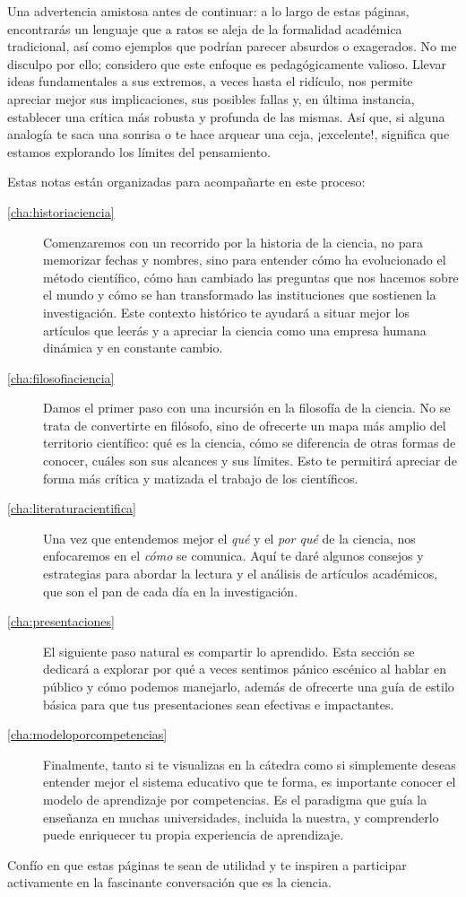 Una advertencia amistosa antes de continuar: a lo largo de estas páginas, encontrarás un lenguaje que a ratos se aleja de la formalidad académica tradicional, así como ejemplos que podrían parecer absurdos o exagerados.
No me disculpo por ello; considero que este enfoque es pedagógicamente valioso.
Llevar ideas fundamentales a sus extremos, a veces hasta el ridículo, nos permite apreciar mejor sus implicaciones, sus posibles fallas y, en última instancia, establecer una crítica más robusta y profunda de las mismas.
Así que, si alguna analogía te saca una sonrisa o te hace arquear una ceja, ¡excelente!, significa que estamos explorando los límites del pensamiento.

Estas notas están organizadas para acompañarte en este proceso:

\begin{description}
	\item[\autoref{cha:historiaciencia}] Comenzaremos con un recorrido por la historia de la ciencia, no para memorizar fechas y nombres, sino para entender cómo ha evolucionado el método científico, cómo han cambiado las preguntas que nos hacemos sobre el mundo y cómo se han transformado las instituciones que sostienen la investigación.
	      Este contexto histórico te ayudará a situar mejor los artículos que leerás y a apreciar la ciencia como una empresa humana dinámica y en constante cambio.
	\item[\autoref{cha:filosofiaciencia}] Damos el primer paso con una incursión en la filosofía de la ciencia.
	      No se trata de convertirte en filósofo, sino de ofrecerte un mapa más amplio del territorio científico: qué es la ciencia, cómo se diferencia de otras formas de conocer, cuáles son sus alcances y sus límites.
	      Esto te permitirá apreciar de forma más crítica y matizada el trabajo de los científicos.
	\item[\autoref{cha:literaturacientifica}] Una vez que entendemos mejor el \emph{qué} y el \emph{por qué} de la ciencia, nos enfocaremos en el \emph{cómo} se comunica.
	      Aquí te daré algunos consejos y estrategias para abordar la lectura y el análisis de artículos académicos, que son el pan de cada día en la investigación.
	\item[\autoref{cha:presentaciones}] El siguiente paso natural es compartir lo aprendido.
	      Esta sección se dedicará a explorar por qué a veces sentimos pánico escénico al hablar en público y cómo podemos manejarlo, además de ofrecerte una guía de estilo básica para que tus presentaciones sean efectivas e impactantes.
	\item[\autoref{cha:modeloporcompetencias}] Finalmente, tanto si te visualizas en la cátedra como si simplemente deseas entender mejor el sistema educativo que te forma, es importante conocer el modelo de aprendizaje por competencias.
	      Es el paradigma que guía la enseñanza en muchas universidades, incluida la nuestra, y comprenderlo puede enriquecer tu propia experiencia de aprendizaje.
\end{description}

Confío en que estas páginas te sean de utilidad y te inspiren a participar activamente en la fascinante conversación que es la ciencia.
